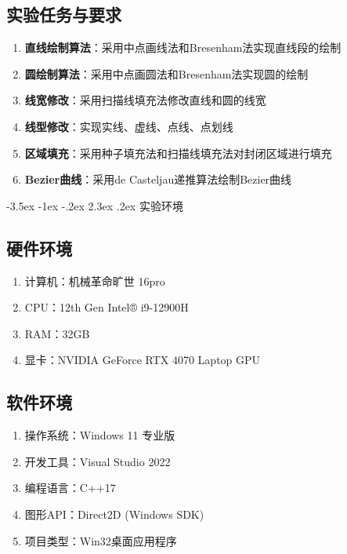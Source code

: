 \documentclass[12pt,a4paper]{article}
\makeatletter
\renewcommand\section{\@startsection{section}{1}{\z@}%
    {-3.5ex \@plus -1ex \@minus -.2ex}%
    {2.3ex \@plus.2ex}%
    {\normalfont\Large\bfseries\songti}}
\makeatother
\begin{document}
\subsection{实验任务与要求}

\begin{tcolorbox}
\begin{enumerate}
    \item \textbf{直线绘制算法}：采用中点画线法和Bresenham法实现直线段的绘制
    \item \textbf{圆绘制算法}：采用中点画圆法和Bresenham法实现圆的绘制
    \item \textbf{线宽修改}：采用扫描线填充法修改直线和圆的线宽
    \item \textbf{线型修改}：实现实线、虚线、点线、点划线
    \item \textbf{区域填充}：采用种子填充法和扫描线填充法对封闭区域进行填充
    \item \textbf{Bezier曲线}：采用de Casteljau递推算法绘制Bezier曲线
\end{enumerate}
\end{tcolorbox}

\clearpage

\section{实验环境}
\begin{tcolorbox}
\subsection{硬件环境}

\begin{enumerate}
    \item 计算机：机械革命旷世 16pro
    \item CPU：12th Gen Intel® i9-12900H
    \item RAM：32GB
    \item 显卡：NVIDIA GeForce RTX 4070 Laptop GPU
\end{enumerate}

\subsection{软件环境}

\begin{enumerate}
    \item 操作系统：Windows 11 专业版
    \item 开发工具：Visual Studio 2022
    \item 编程语言：C++17
    \item 图形API：Direct2D (Windows SDK)
    \item 项目类型：Win32桌面应用程序
\end{enumerate}
\end{tcolorbox}
\end{document}
